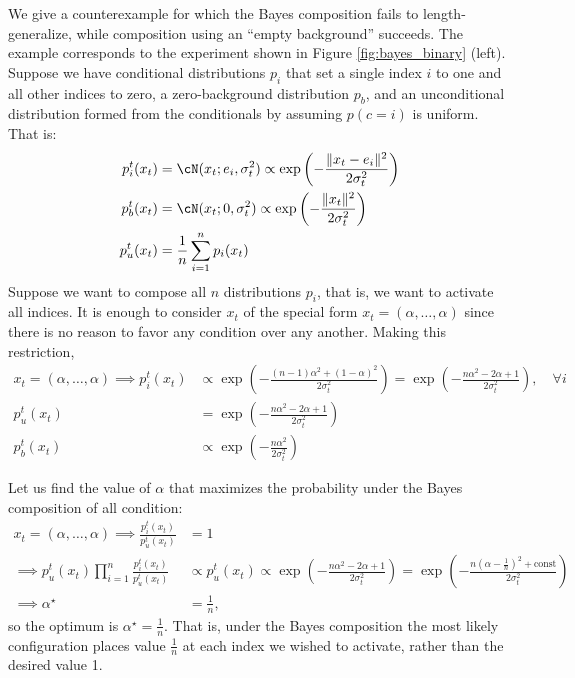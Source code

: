 We give a counterexample for which the Bayes composition fails to length-generalize, while composition using an ``empty background'' succeeds. The example corresponds to the experiment shown in Figure \ref{fig:bayes_binary} (left). Suppose we have conditional distributions $p_i$ that set a single index $i$ to one and all other indices to zero, a zero-background distribution $p_b$, and an unconditional distribution formed from the conditionals by assuming $p(c=i)$ is uniform. That is:
\begin{align}
    p_i^t(x_t) &= \cN(x_t; e_i, \sigma_t^2) \propto \exp \left( -\frac{\|x_t - e_i\|^2}{2\sigma_t^2} \right) \notag\\
    p_b^t(x_t) &= \cN(x_t; 0, \sigma_t^2) \propto \exp \left( -\frac{\|x_t\|^2}{2\sigma_t^2} \right) \notag \\
    p_u^t(x_t) &= \frac{1}{n} \sum_{i=1}^n p_i(x_t)
    \label{eq:binary_single_index}
\end{align}
Suppose we want to compose all $n$ distributions $p_i$, that is, we want to activate all indices. It is enough to consider $x_t$ of the special form $x_t = (\alpha, \ldots, \alpha)$ since there is no reason to favor any condition over any another. Making this restriction,
\begin{align*}
    x_t = (\alpha, \ldots, \alpha) \implies 
    p_i^t(x_t) &\propto \exp \left( -\frac{(n-1)\alpha^2 + (1-\alpha)^2}{2\sigma_t^2} \right)
    = \exp \left( -\frac{n\alpha^2-2\alpha+1}{2\sigma_t^2} \right), \quad \forall i \\
    p_u^t(x_t) &= \exp \left( -\frac{n\alpha^2-2\alpha+1}{2\sigma_t^2} \right) \\
    p_b^t(x_t) &\propto \exp \left( -\frac{n\alpha^2}{2\sigma_t^2} \right)
\end{align*}

Let us find the value of $\alpha$ that maximizes the probability under the Bayes composition of all condition:
\begin{align*}
    x_t = (\alpha, \ldots, \alpha) \implies
    \frac{p_i^t(x_t)}{p_u^t(x_t)} &= 1\\
    \implies p_u^t(x_t) \prod_{i=1}^n \frac{p_i^t(x_t)}{p_u^t(x_t)} &\propto p_u^t(x_t) \propto \exp \left( -\frac{n\alpha^2-2\alpha+1}{2\sigma_t^2} \right) 
    = \exp \left( -\frac{n(\alpha - \frac{1}{n})^2 + \text{const}}{2 \sigma_t^2} \right) \\
    \implies \alpha^\star &= \frac{1}{n},
\end{align*}
so the optimum is $\alpha^\star = \frac{1}{n}$. That is, under the Bayes composition the most likely configuration places value $\frac{1}{n}$ at each index we wished to activate, rather than the desired value 1.

